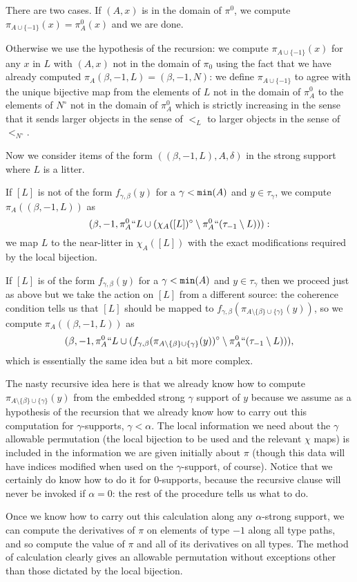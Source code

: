 \begin{description}
There are two cases.  If $(A,x)$ is in the domain of $\pi^0$, we compute $\pi_{A \cup \{-1\}}(x) = \pi^0_A(x)$ and we are done.

Otherwise we use the hypothesis of the recursion:  we compute $\pi_{A \cup \{-1\}}(x)$ for any $x$ in $L$ with $(A,x)$ not in the domain of $\pi_0$ using the fact that we have already computed $\pi_A(\beta,-1,L) = (\beta,-1,N)$:  we define $\pi_{A \cup \{-1\}}$ to agree with the unique bijective map from the
elements of $L$ not in the domain of $\pi^0_A$ to the elements of $N^{\circ}$ not in the domain of $\pi^0_A$ which is strictly increasing in the sense that it sends larger objects in the sense of $<_L$ to larger objects in the sense of $<_{N^{\circ}}$.

Now we consider items of the form $((\beta,-1,L),A,\delta)$ in the strong support where $L$ is a litter.

If $[L]$ is not of the form $f_{\gamma,\beta}(y)$ for a $\gamma<{\tt min}(A)$ and $y \in \tau_\gamma$,
we compute $\pi_A((\beta,-1,L))$ as $$(\beta,-1,{\pi^0_A}``L \cup (\chi_A([L])^\circ \setminus {\pi^0_A}``(\tau_{-1} \setminus L))):$$ we map
$L$ to the near-litter in $\chi_A([L])$ with the exact modifications required by the local bijection.

If $[L]$ is of the form $f_{\gamma,\beta}(y)$ for a $\gamma<{\tt min}(A)$ and $y \in \tau_\gamma$ then we proceed just as above but we take the action on $[L]$ from a different source:
the coherence condition tells us that $[L]$ should be mapped to $f_{\gamma,\beta}(\pi_{A \setminus \{\beta\} \cup \{\gamma\}}(y))$, so we compute
$\pi_A((\beta,-1,L))$ as $$(\beta,-1,{\pi^0_A}``L \cup (f_{\gamma,\beta}(\pi_{A \setminus \{\beta\} \cup \{\gamma\}}(y))^\circ \setminus {\pi^0_A}``(\tau_{-1}\setminus L))),$$  which is essentially the same idea but a bit more complex.

The nasty recursive idea here is that we already know how to compute $\pi_{A \setminus \{\beta\} \cup \{\gamma\}}(y)$ from the embedded strong $\gamma$ support of $y$ because we assume as a hypothesis of the recursion that we already know how to carry out this computation for $\gamma$-supports, $\gamma<\alpha$.  The  local information we need about the $\gamma$ allowable permutation (the local bijection to be used and the relevant $\chi$ maps) is included in the information we are given initially about $\pi$ (though this data will have indices modified when used on the $\gamma$-support, of course).  Notice that we certainly do know how to do it for 0-supports, because the recursive clause will never be invoked if $\alpha=0$:  the rest of the procedure tells us what to do.

Once we know how to carry out this calculation along any $\alpha$-strong support, we can compute the derivatives of $\pi$ on elements of type $-1$  along all type paths, and so compute the value of $\pi$ and all of its derivatives on all types.  The method of calculation clearly gives an allowable permutation without exceptions other than those dictated by the local bijection.

\end{description}
